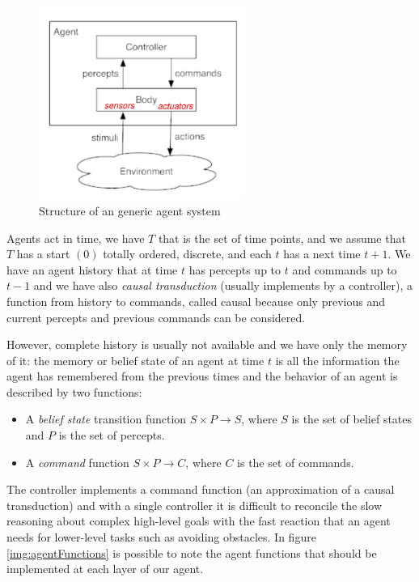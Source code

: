 \begin{figure}
    \includegraphics[width=0.6\textwidth]{Images/agent}
    \caption{Structure of an generic agent system}
    \label{img:agentSystem}
\end{figure}

Agents act in time, we have $T$ that is the set of time points, and we assume that $T$ has a start $(0)$
totally ordered, discrete, and each $t$ has a next time $t + 1$.\newline
We have an agent history that at time $t$ has percepts up to $t$ and commands up to $t - 1$ and we 
have also \emph{causal transduction} (usually implements by a controller), a function from history to commands,
called causal because only previous and current percepts and previous commands can be considered.

However, complete history is usually not available and we have only the memory of it:
the memory or belief state of an agent at time $t$ is all the information the agent
has remembered from the previous times and the behavior of an agent is described by two functions:
\begin{itemize}
    \item A \emph{belief state} transition function $S \times P \to S$, where $S$ is the set of belief states 
          and $P$ is the set of percepts.
    \item A \emph{command} function $S \times P \to C$, where $C$ is the set of commands.
\end{itemize}
The controller implements a command function (an approximation of a causal transduction) and 
with a single controller it is difficult to reconcile the slow reasoning about complex high-level goals
with the fast reaction that an agent needs for lower-level tasks such as avoiding obstacles.\newline
In figure \ref{img:agentFunctions} is possible to note the agent functions that should be implemented 
at each layer of our agent.

